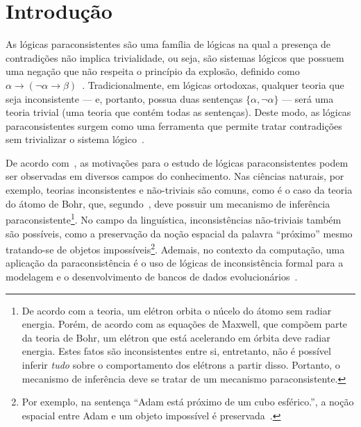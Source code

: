 \chapter{Introdução}\label{cap:Introducao}


As lógicas paraconsistentes são uma família de lógicas na qual a presença de contradições não implica trivialidade, ou seja, são sistemas lógicos que possuem uma negação que não respeita o princípio da explosão, definido como $\alpha \to (\neg \alpha \to \beta)$~\cite{carnielli2007}. Tradicionalmente, em lógicas ortodoxas, qualquer teoria que seja inconsistente {---} e, portanto, possua duas sentenças $\{\alpha, \neg \alpha\}$ {---} será uma teoria trivial (uma teoria que contém todas as sentenças). Deste modo, as lógicas paraconsistentes surgem como uma ferramenta que permite tratar contradições sem trivializar o sistema lógico~\cite{Carnielli_Coniglio_2016}.

De acordo com~, as motivações para o estudo de lógicas paraconsistentes podem ser observadas em diversos campos do conhecimento. Nas ciências naturais, por exemplo, teorias inconsistentes e não-triviais são comuns, como é o caso da teoria do átomo de Bohr, que, segundo~, deve possuir um mecanismo de inferência paraconsistente\footnote{De acordo com a teoria, um elétron orbita o núcelo do átomo sem radiar energia. Porém, de acordo com as equações de Maxwell, que compõem parte da teoria de Bohr, um elétron que está acelerando em órbita deve radiar energia. Estes fatos são inconsistentes entre si, entretanto, não é possível inferir \textit{tudo} sobre o comportamento dos elétrons a partir disso. Portanto, o mecanismo de inferência deve se tratar de um mecanismo paraconsistente.}. No campo da linguística, inconsistências não-triviais também são possíveis, como a preservação da noção espacial da palavra ``próximo'' mesmo tratando-se de objetos impossíveis\footnote{Por exemplo, na sentença ``Adam está próximo de um cubo esférico.'', a noção espacial entre Adam e um objeto impossível é preservada~\cite{McGinnis2013-MCGTUA}.}. Ademais, no contexto da computação, uma aplicação da paraconsistência é o uso de lógicas de inconsistência formal para a modelagem e o desenvolvimento de bancos de dados evolucionários~\cite{carnielli2000formal}.

